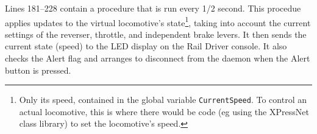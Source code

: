 Lines 181--228 contain a procedure that is run every 1/2 second.  This
procedue applies updates to the virtual locomotive's
state\footnote{Only its speed, contained in the global variable
\texttt{CurrentSpeed}. To control an actual locomotive, this is where
there would be code (eg using the XPressNet class library) to set the
locomotive's speed.}, taking into account the current settings of the
reverser, throttle, and independent brake levers. It then sends the
current state (speed) to the LED display on the Rail Driver console. It
also checks the Alert flag and arranges to disconnect from the daemon
when the Alert button is pressed.


